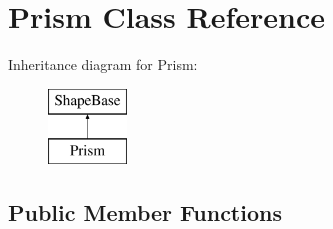 \hypertarget{classPrism}{}\section{Prism Class Reference}
\label{classPrism}
Inheritance diagram for Prism\+:\begin{figure}[H]
\begin{center}
\leavevmode
\includegraphics[height=2.000000cm]{classPrism}
\end{center}
\end{figure}
\subsection*{Public Member Functions}
